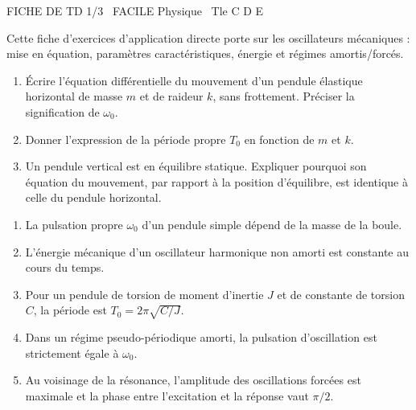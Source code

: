 \documentclass[11pt]{article}
\begin{document}
\begin{tcolorbox}[enhanced,colback=popink,colframe=popink,arc=10pt,boxrule=0pt,left=12pt,right=12pt,top=9pt,bottom=9pt]
{\color{white}\popxbold\small FICHE DE TD 1/3 \textbullet\ FACILE \hfill Physique \textbullet\ Tle C D E\par}
\end{tcolorbox}
\vspace{4pt}
Cette fiche d'exercices d'application directe porte sur les oscillateurs mécaniques : mise en équation, paramètres caractéristiques, énergie et régimes amortis/forcés.

\begin{exercice}
\begin{enumerate}
    \item Écrire l'équation différentielle du mouvement d'un pendule élastique horizontal de masse $m$ et de raideur $k$, sans frottement. Préciser la signification de $\omega_0$.
    \item Donner l'expression de la période propre $T_0$ en fonction de $m$ et $k$.
    \item Un pendule vertical est en équilibre statique. Expliquer pourquoi son équation du mouvement, par rapport à la position d'équilibre, est identique à celle du pendule horizontal.
\end{enumerate}
\end{exercice}

\begin{exercice}
\begin{enumerate}
    \item La pulsation propre $\omega_0$ d'un pendule simple dépend de la masse de la boule.
    \item L'énergie mécanique d'un oscillateur harmonique non amorti est constante au cours du temps.
    \item Pour un pendule de torsion de moment d'inertie $J$ et de constante de torsion $C$, la période est $T_0 = 2\pi\sqrt{C/J}$.
    \item Dans un régime pseudo-périodique amorti, la pulsation d'oscillation est strictement égale à $\omega_0$.
    \item Au voisinage de la résonance, l'amplitude des oscillations forcées est maximale et la phase entre l'excitation et la réponse vaut $\pi/2$.
\end{enumerate}
\end{exercice}
\end{document}
